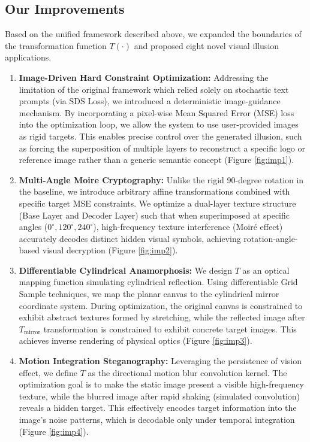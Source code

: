 \documentclass{article}
\begin{document}
\subsection{Our Improvements}
Based on the unified framework described above, we expanded the boundaries of the transformation function $T(\cdot)$ and proposed eight novel visual illusion applications.

\begin{enumerate}
    \item \textbf{Image-Driven Hard Constraint Optimization:} Addressing the limitation of the original framework which relied solely on stochastic text prompts (via SDS Loss), we introduced a deterministic image-guidance mechanism. By incorporating a pixel-wise Mean Squared Error (MSE) loss into the optimization loop, we allow the system to use user-provided images as rigid targets. This enables precise control over the generated illusion, such as forcing the superposition of multiple layers to reconstruct a specific logo or reference image rather than a generic semantic concept (Figure \ref{fig:imp1}).

    \item \textbf{Multi-Angle Moire Cryptography:} Unlike the rigid 90-degree rotation in the baseline, we introduce arbitrary affine transformations combined with specific target MSE constraints. We optimize a dual-layer texture structure (Base Layer and Decoder Layer) such that when superimposed at specific angles ($0^\circ, 120^\circ, 240^\circ$), high-frequency texture interference (Moiré effect) accurately decodes distinct hidden visual symbols, achieving rotation-angle-based visual decryption (Figure \ref{fig:imp2}).

    \item \textbf{Differentiable Cylindrical Anamorphosis:} We design $T$ as an optical mapping function simulating cylindrical reflection. Using differentiable Grid Sample techniques, we map the planar canvas to the cylindrical mirror coordinate system. During optimization, the original canvas is constrained to exhibit abstract textures formed by stretching, while the reflected image after $T_{\text{mirror}}$ transformation is constrained to exhibit concrete target images. This achieves inverse rendering of physical optics (Figure \ref{fig:imp3}).

    \item \textbf{Motion Integration Steganography:} Leveraging the persistence of vision effect, we define $T$ as the directional motion blur convolution kernel. The optimization goal is to make the static image present a visible high-frequency texture, while the blurred image after rapid shaking (simulated convolution) reveals a hidden target. This effectively encodes target information into the image's noise patterns, which is decodable only under temporal integration (Figure \ref{fig:imp4}).


\end{enumerate}
\end{document}
